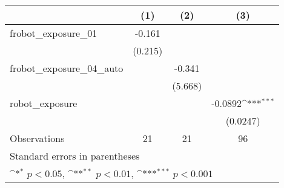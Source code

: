 {
\def\sym#1{\ifmmode^{#1}\else\(^{#1}\)\fi}
\begin{tabular}{l*{3}{c}}
\toprule
                    &\multicolumn{1}{c}{(1)}         &\multicolumn{1}{c}{(2)}         &\multicolumn{1}{c}{(3)}         \\
\midrule
frobot\_exposure\_01  &      -0.161         &                     &                     \\
                    &     (0.215)         &                     &                     \\
\addlinespace
frobot\_exposure\_04\_auto&                     &      -0.341         &                     \\
                    &                     &     (5.668)         &                     \\
\addlinespace
robot\_exposure      &                     &                     &     -0.0892\sym{***}\\
                    &                     &                     &    (0.0247)         \\
\midrule
Observations        &          21         &          21         &          96         \\
\bottomrule
\multicolumn{4}{l}{\footnotesize Standard errors in parentheses}\\
\multicolumn{4}{l}{\footnotesize \sym{*} \(p<0.05\), \sym{**} \(p<0.01\), \sym{***} \(p<0.001\)}\\
\end{tabular}
}
